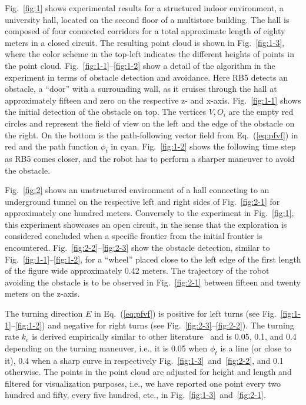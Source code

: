 \documentclass[letterpaper,10pt,conference,twoside]{IEEEtran}
\theoremstyle{definition}
\begin{document}
Fig.~\ref{fig:1} shows experimental results for a structured indoor environment, a university hall, located on the second floor of a multistore building. The hall is composed of four connected corridors for a total approximate length of eighty meters in a closed circuit. %
The resulting point cloud is shown in Fig.~\ref{fig:1-3}, where the color scheme in the top-left indicates the different heights of points in the point cloud. 
%
%
Fig.~\ref{fig:1-1}--\ref{fig:1-2} show a detail of the algorithm in the experiment in terms of obstacle detection and avoidance. Here RB5 detects an obstacle, a ``door'' with a surrounding wall, as it cruises through the hall at approximately fifteen and zero on the respective z- and x-axis. Fig.~\ref{fig:1-1} shows the initial detection of the obstacle on top. The vertices $V, O_i$ are the empty red circles and represent the field of view on the left and the edge of the obstacle on the right. On the bottom is the path-following vector field from Eq.~(\ref{eq:pfvf}) in red and the path function $\phi_t$ in cyan. Fig.~\ref{fig:1-2} shows the following time step as RB5 comes closer, and the robot has to perform a sharper maneuver to avoid the obstacle.

Fig.~\ref{fig:2} shows an unstructured environment of a hall connecting to an underground tunnel on the respective left and right sides of Fig.~\ref{fig:2-1} for approximately one hundred meters. Conversely to the experiment in Fig.~\ref{fig:1}, this experiment showcases an open circuit, in the sense that the exploration is considered concluded when a specific frontier from the initial frontier is encountered. Fig.~\ref{fig:2-2}--\ref{fig:2-3} show the obstacle detection, similar to Fig.~\ref{fig:1-1}--\ref{fig:1-2}, for a ``wheel'' placed close to the left edge of the first length of the figure wide approximately 0.42 meters. The trajectory of the robot avoiding the obstacle is to be observed in Fig.~\ref{fig:2-1} between fifteen and twenty meters on the z-axis.

The turning direction $E$ in Eq.~(\ref{eq:pfvf}) is positive for left turns (see Fig.~\ref{fig:1-1}--\ref{fig:1-2}) and negative for right turns (see Fig.~\ref{fig:2-3}--\ref{fig:2-2}). The turning rate $k_e$ is derived empirically similar to other literature~\cite{seewald2022energy,garcia2017guidance} and is 0.05, 0.1, and 0.4 depending on the turning maneuver, i.e., it is 0.05 when $\phi_t$ is a line (or close to it), 0.4 when a sharp curve in respectively Fig.~\ref{fig:1-3}~and~\ref{fig:2-2}, and 0.1 otherwise. The points in the point cloud are adjusted for height and length and filtered for visualization purposes, i.e., we have reported one point every two hundred and fifty, every five hundred, etc., in Fig.~\ref{fig:1-3}~and~\ref{fig:2-1}.
\end{document}
